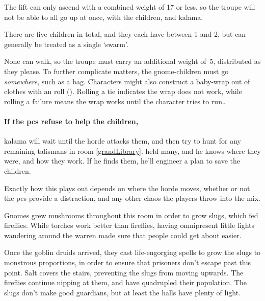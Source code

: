 The lift can only ascend with a combined \gls{weight} of 17 or less, so the troupe will not be able to all go up at once, with the children, and \gls{kalama}.


There are five children in total, and they each have  between 1 and 2, but can generally be treated as a single `\gls{swarm}'.

None can walk, so the troupe must carry an additional \gls{weight} of~5, distributed as they please.
To further complicate matters, the gnome-children must go \emph{somewhere}, such as a bag.
Characters might also construct a baby-wrap out of clothes with an  roll (\tn[10]).
Rolling a tie indicates the wrap does not work, while rolling a failure means the wrap works until the character tries to run\ldots

\paragraph{If the \glspl{pc} refuse to help the children,}
\gls{kalama} will wait until the horde attacks them, and then try to hunt for any remaining \glspl{talisman} in room \vref{grandLibrary}.
 held many, and he knows where they were, and how they work.
If he finds them, he'll engineer a plan to save the children.

Exactly how this plays out depends on where the horde moves, whether or not the \glspl{pc} provide a distraction, and any other chaos the players throw into the mix.


\begin{exampletext}
Gnomes grew mushrooms throughout this room in order to grow slugs, which fed fireflies.
While torches work better than fireflies, having omnipresent little lights wandering around the \gls{warren} made sure that people could get about easier.

Once the goblin druids arrived, they cast life-engorging spells to grow the slugs to monstrous proportions, in order to ensure that prisoners don't escape past this point.
Salt covers the stairs, preventing the slugs from moving upwards.
The fireflies continue nipping at them, and have quadrupled their population.
The slugs don't make good guardians, but at least the halls have plenty of light.
\end{exampletext}


